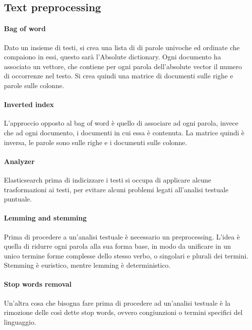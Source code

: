 \subsection{Text preprocessing}

\paragraph{Bag of word}
Dato un insieme di testi, si crea una lista di di parole univoche ed ordinate che compaiono in essi, 
questo sarà l'Absolute dictionary.
Ogni documento ha associato un vettore, che contiene per ogni parola dell'absolute vector
il numero di occorrenze nel testo.
Si crea quindi una matrice di documenti sulle righe e parole sulle colonne.

\paragraph{Inverted index}
L'approccio opposto al bag of word è quello di associare ad ogni parola, invece che ad ogni 
documento, i documenti in cui essa è contenuta.
La matrice quindi è inversa, le parole sono sulle righe e i documenti sulle colonne.

\paragraph{Analyzer}
Elasticsearch prima di indicizzare i testi si occupa di applicare alcune trasformazioni 
ai testi, per evitare alcuni problemi legati all'analisi testuale puntuale.

\paragraph{Lemming and stemming}
Prima di procedere a un'analisi testuale è necessario un preprocessing.
L'idea è quella di ridurre ogni parola alla sua forma base, in modo da unificare in un 
unico termine forme complesse dello stesso verbo, o singolari e plurali dei termini.
Stemming è euristico, mentre lemming è deterministico.

\paragraph{Stop words removal}
Un'altra cosa che bisogna fare prima di procedere ad un'analisi testuale è 
la rimozione delle così dette stop words, ovvero congiunzioni o termini specifici del 
linguaggio.

